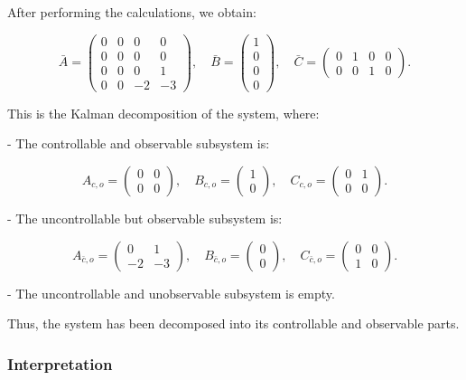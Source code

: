 \documentclass{article}
\begin{document}
After performing the calculations, we obtain:

\[
\bar{A} = \begin{pmatrix}
0 & 0 & 0 & 0 \\
0 & 0 & 0 & 0 \\
0 & 0 & 0 & 1 \\
0 & 0 & -2 & -3
\end{pmatrix}, \quad
\bar{B} = \begin{pmatrix}
1 \\
0 \\
0 \\
0
\end{pmatrix}, \quad
\bar{C} = \begin{pmatrix}
0 & 1 & 0 & 0 \\
0 & 0 & 1 & 0
\end{pmatrix}.
\]

This is the Kalman decomposition of the system, where:

- The controllable and observable subsystem is:

\[
A_{c,o} = \begin{pmatrix}
0 & 0 \\
0 & 0
\end{pmatrix}, \quad
B_{c,o} = \begin{pmatrix}
1 \\
0
\end{pmatrix}, \quad
C_{c,o} = \begin{pmatrix}
0 & 1 \\
0 & 0
\end{pmatrix}.
\]

- The uncontrollable but observable subsystem is:

\[
A_{\bar{c},o} = \begin{pmatrix}
0 & 1 \\
-2 & -3
\end{pmatrix}, \quad
B_{\bar{c},o} = \begin{pmatrix}
0 \\
0
\end{pmatrix}, \quad
C_{\bar{c},o} = \begin{pmatrix}
0 & 0 \\
1 & 0
\end{pmatrix}.
\]

- The uncontrollable and unobservable subsystem is empty.

Thus, the system has been decomposed into its controllable and observable parts.

\subsubsection{Interpretation}
\end{document}
